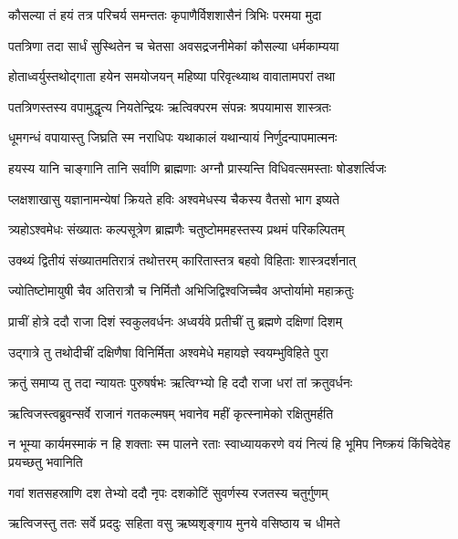 \twolineshloka
{कौसल्या तं हयं तत्र परिचर्य समन्ततः}
{कृपाणैर्विशशासैनं त्रिभिः परमया मुदा} %

\twolineshloka
{पतत्रिणा तदा सार्धं सुस्थितेन च चेतसा}
{अवसद्रजनीमेकां कौसल्या धर्मकाम्यया} %

\twolineshloka
{होताध्वर्युस्तथोद्गाता हयेन समयोजयन्}
{महिष्या परिवृत्थ्याथ वावातामपरां तथा} %

\twolineshloka
{पतत्रिणस्तस्य वपामुद्धृत्य नियतेन्द्रियः}
{ऋत्विक्परम संपन्नः श्रपयामास शास्त्रतः} %

\twolineshloka
{धूमगन्धं वपायास्तु जिघ्रति स्म नराधिपः}
{यथाकालं यथान्यायं निर्णुदन्पापमात्मनः} %

\twolineshloka
{हयस्य यानि चाङ्गानि तानि सर्वाणि ब्राह्मणाः}
{अग्नौ प्रास्यन्ति विधिवत्समस्ताः षोडशर्त्विजः} %

\twolineshloka
{प्लक्षशाखासु यज्ञानामन्येषां क्रियते हविः}
{अश्वमेधस्य चैकस्य वैतसो भाग इष्यते} %

\twolineshloka
{त्र्यहोऽश्वमेधः संख्यातः कल्पसूत्रेण ब्राह्मणैः}
{चतुष्टोममहस्तस्य प्रथमं परिकल्पितम्} %

\twolineshloka
{उक्थ्यं द्वितीयं संख्यातमतिरात्रं तथोत्तरम्}
{कारितास्तत्र बहवो विहिताः शास्त्रदर्शनात्} %

\twolineshloka
{ज्योतिष्टोमायुषी चैव अतिरात्रौ च निर्मितौ}
{अभिजिद्विश्वजिच्चैव अप्तोर्यामो महाक्रतुः} %

\twolineshloka
{प्राचीं होत्रे ददौ राजा दिशं स्वकुलवर्धनः}
{अध्वर्यवे प्रतीचीं तु ब्रह्मणे दक्षिणां दिशम्} %

\twolineshloka
{उद्गात्रे तु तथोदीचीं दक्षिणैषा विनिर्मिता}
{अश्वमेधे महायज्ञे स्वयम्भुविहिते पुरा} %

\twolineshloka
{क्रतुं समाप्य तु तदा न्यायतः पुरुषर्षभः}
{ऋत्विग्भ्यो हि ददौ राजा धरां तां क्रतुवर्धनः} %

\twolineshloka
{ऋत्विजस्त्वब्रुवन्सर्वे राजानं गतकल्मषम्}
{भवानेव महीं कृत्स्नामेको रक्षितुमर्हति} %

\threelineshloka
{न भूम्या कार्यमस्माकं न हि शक्ताः स्म पालने}
{रताः स्वाध्यायकरणे वयं नित्यं हि भूमिप}
{निष्क्रयं किंचिदेवेह प्रयच्छतु भवानिति} %

\twolineshloka
{गवां शतसहस्राणि दश तेभ्यो ददौ नृपः}
{दशकोटिं सुवर्णस्य रजतस्य चतुर्गुणम्} %

\twolineshloka
{ऋत्विजस्तु ततः सर्वे प्रददुः सहिता वसु}
{ऋष्यशृङ्गाय मुनये वसिष्ठाय च धीमते} %

